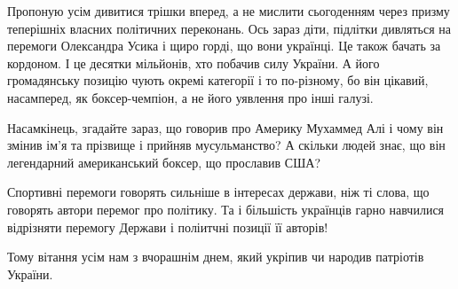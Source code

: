 Пропоную усім дивитися трішки вперед, а не мислити сьогоденням через призму
теперішніх власних політичних переконань. Ось зараз діти, підлітки дивляться на
перемоги Олександра Усика і щиро горді, що вони українці. Це також бачать за
кордоном. І це десятки мільйонів, хто побачив силу України. А його громадянську
позицію чують окремі категорії і то по-різному, бо він цікавий, насамперед, як
боксер-чемпіон, а не його уявлення про інші галузі. 

Насамкінець, згадайте зараз, що говорив про Америку Мухаммед Алі і чому він
змінив ім'я та прізвище і прийняв мусульманство? А скільки людей знає, що він
легендарний американський боксер, що прославив США?  

Спортивні перемоги говорять сильніше в інтересах держави, ніж ті слова, що
говорять автори перемог про політику. Та і більшість українців гарно навчилися
відрізняти перемогу Держави і поліитчні позиції її авторів! 

Тому вітання усім нам з вчорашнім днем, який укріпив чи народив патріотів
України.

